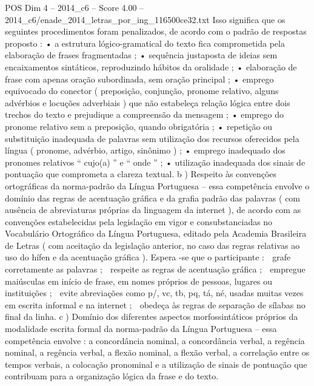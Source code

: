 \begin{textsample}{POS Dim 4 – 2014\_c6 – Score 4.00 – 2014\_c6/enade\_2014\_letras\_por\_ing\_116500ce32.txt}
Isso significa que os seguintes procedimentos foram penalizados, de acordo com o padrão de respostas proposto : • a estrutura lógico-gramatical do texto fica comprometida pela elaboração de frases fragmentadas ; • sequência justaposta de ideias sem encaixamentos sintáticos, reproduzindo hábitos da oralidade ; • elaboração de frase com apenas oração subordinada, sem oração principal ; • emprego equivocado do conector ( preposição, conjunção, pronome relativo, alguns advérbios e locuções adverbiais ) que não estabeleça relação lógica entre dois trechos do texto e prejudique a compreensão da mensagem ; • emprego do pronome relativo sem a preposição, quando obrigatória ; • repetição ou substituição inadequada de palavras sem utilização dos recursos oferecidos pela língua ( pronome, advérbio, artigo, sinônimo ) ; • emprego inadequado dos pronomes relativos “ cujo(a) ” e “ onde ” ; • utilização inadequada dos sinais de pontuação que comprometa a clareza textual. b ) Respeito às convenções ortográficas da norma-padrão da Língua Portuguesa – essa competência envolve o domínio das regras de acentuação gráfica e da grafia padrão das palavras ( com ausência de abreviaturas próprias da linguagem da internet ), de acordo com as convenções estabelecidas pela legislação em vigor e consubstanciadas no Vocabulário Ortográfico da Língua Portuguesa, editado pela Academia Brasileira de Letras ( com aceitação da legislação anterior, no caso das regras relativas ao uso do hífen e da acentuação gráfica ).
Espera -se que o participante :  grafe corretamente as palavras ;  respeite as regras de acentuação gráfica ;  empregue maiúsculas em início de frase, em nomes próprios de pessoas, lugares ou instituições ;  evite abreviações como p/, vc, tb, pq, tá, né, usadas muitas vezes em escrita informal e na internet ;  obedeça às regras de separação de sílabas no final da linha. c ) Domínio dos diferentes aspectos morfossintáticos próprios da modalidade escrita formal da norma-padrão da Língua Portuguesa – essa competência envolve : a concordância nominal, a concordância verbal, a regência nominal, a regência verbal, a flexão nominal, a flexão verbal, a correlação entre os tempos verbais, a colocação pronominal e a utilização de sinais de pontuação que contribuam para a organização lógica da frase e do texto.

\end{textsample}
